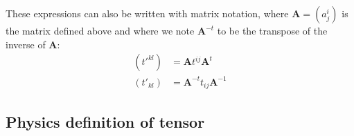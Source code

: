 These expressions can also be written with matrix notation, where $\mathbf{A} = \left(a^i_j\right)$ is the matrix defined above and where we note $\mathbf{A}^{-t}$ to be the transpose of the inverse of $\mathbf{A}$:
\begin{align*}
	\left(t'^{kl}\right) &= \mathbf{A} t^{ij} \mathbf{A}^t \\
	\left(t'_{kl}\right) &= \mathbf{A}^{-t} t_{ij} \mathbf{A}^{-1}
\end{align*}

\subsection{Physics definition of tensor}









